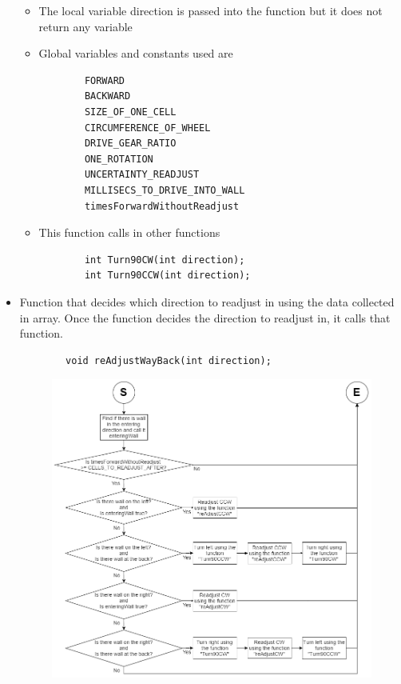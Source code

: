 \documentclass[11pt]{article}
\begin{document}
\begin{itemize}
\begin{figure}[htp]
\label{}
\end{figure}
	\begin{itemize}
	\item The local variable direction is passed into the function but it does not return any variable
	\item Global variables and constants used are
	\begin{verbatim}
		FORWARD
		BACKWARD
		SIZE_OF_ONE_CELL
		CIRCUMFERENCE_OF_WHEEL
		DRIVE_GEAR_RATIO
		ONE_ROTATION
		UNCERTAINTY_READJUST
		MILLISECS_TO_DRIVE_INTO_WALL
		timesForwardWithoutReadjust
	\end{verbatim}
	\item This function calls in other functions
	\begin{verbatim}
		int Turn90CW(int direction);
		int Turn90CCW(int direction);
	\end{verbatim}
	\end{itemize}
\item Function that decides which direction to readjust in using the data collected in array. Once the function decides the direction to readjust in, it calls that function.
	\begin{verbatim}
		void reAdjustWayBack(int direction);
	\end{verbatim}
\begin{figure}[htp]
\centering
\includegraphics[scale=0.46]{images/Software_Flowchart/reAdjustWayBack.png}

\end{figure}
\end{itemize}
\end{document}
